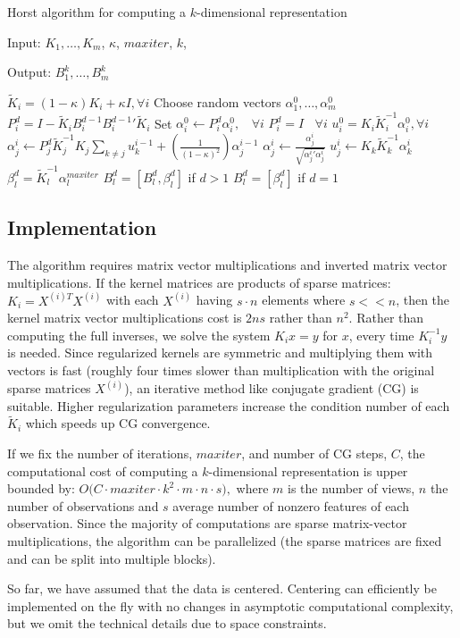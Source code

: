 \begin{algorithm}
\caption{Horst algorithm for computing a $k$-dimensional representation}
Input: $K_1, \ldots, K_m$, $\kappa$, $maxiter$, $k$, \par
Output: $B_1^k, \ldots, B_m^k$
\begin{algorithmic}
\label{fullalg}
\STATE $\tilde{K}_i = (1-\kappa) K_i +  \kappa I, \forall i$
\STATE Choose random vectors $\alpha_1^0, \ldots, \alpha_m^0$
\STATE $P_i^d =I -  \tilde{K}_i B_i^{d-1} {B_i^{d-1}}' \tilde{K}_i$
\STATE Set $\alpha_i^0 \leftarrow P_i^d \alpha_i^0,~~~~ \forall i$
\ELSE
\STATE  $P_i^d = I ~~~~ \forall i$
\ENDIF
\STATE $u_i^0 = K_i \tilde{K}_i^{-1} \alpha_i^0, \forall i$
\STATE $\alpha_j^{i} \leftarrow  P_j^d \tilde{K}_j^{-1} K_j \sum_{k\neq j}  u_k^{i-1}  + \left(\frac{1}{(1-\kappa)^2} \right) \alpha_j^{i-1}$
\STATE $\alpha_j^{i} \leftarrow \frac{\alpha_j^{i}}{\sqrt{{\alpha_j^i}' \alpha_j^i}}$
\STATE $u_j^{i} \leftarrow  K_k  \tilde{K}_k^{-1}  \alpha_k^{i}$
\ENDFOR
\ENDFOR
{}
\STATE $\beta_l^d = \tilde{K}_l^{-1} \alpha_l^{maxiter}$
\STATE $B_l^{d} = [ B_l^d , \beta_l^d]$ if $d > 1$
\STATE $B_l^{d} = [ \beta_l^d]$ if $d = 1$
\ENDFOR
\ENDFOR
\end{algorithmic}
\end{algorithm}



\subsection{Implementation}\label{subsec:implementation}
The algorithm requires matrix vector multiplications and inverted
matrix vector multiplications. If the kernel matrices are products of
sparse matrices: $K_i = X^{(i)T} X^{(i)}$ with each $X^{(i)}$ having
$s\cdot n$ elements
where $s << n$, then the kernel matrix vector multiplications cost is $2 n s$
rather than $n^2$. Rather than computing the full inverses, we solve
the system $K_i x = y$ for $x$, every time $K_i^{-1} y$ is needed. Since
regularized kernels are symmetric and multiplying them with vectors is
fast (roughly four times slower than multiplication with the original sparse matrices $X^{(i)}$), an iterative method like conjugate gradient (CG) is
suitable. Higher regularization parameters increase the condition
number of each $\tilde{K}_i$ which speeds up CG convergence.
\par
If we fix the number of iterations, $maxiter$, and number
of CG steps, $C$, the computational cost of computing a
$k$-dimensional representation is upper bounded by: $O\big(C \cdot
maxiter \cdot k^2 \cdot m \cdot n \cdot s \big),$ where $m$ is the
number of views, $n$ the number of observations and $s$ average number
of nonzero features of each observation.
%
Since the majority of computations are  sparse matrix-vector multiplications, the
algorithm can be parallelized (the sparse matrices are fixed and can be split into multiple
blocks).

So far, we have assumed that the data is centered. Centering can efficiently be implemented on the
fly with no changes in asymptotic computational complexity, but we omit the technical details due to space constraints.


